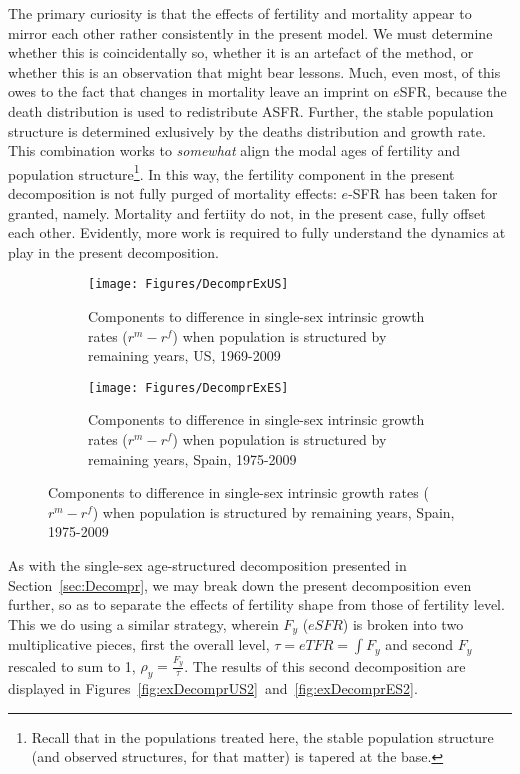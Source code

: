 The primary curiosity is that the effects of fertility and mortality appear to
mirror each other rather consistently in the present model. We must determine
whether this is coincidentally so, whether it is an artefact of the method, or
whether this is an observation that might bear lessons. Much, even most, of this
owes to the fact that changes in mortality leave an imprint on $e$SFR, because
the death distribution is used to redistribute ASFR. Further, the stable
population structure is determined exlusively by the deaths distribution and
growth rate. This combination works to \textit{somewhat} align the modal ages of
fertility and population structure\footnote{Recall that in the populations
treated here, the stable population structure (and observed structures, for
that matter) is tapered at the base.}. In this way, the fertility component in
the present decomposition is not fully purged of mortality effects: $e$-SFR has
been taken for granted, namely. Mortality and fertiity do not, in the present
case, fully offset each other. Evidently, more work is required to fully
understand the dynamics at play in the present decomposition.

\begin{figure}
        \centering
        \begin{subfigure}
                \centering
                \caption{Components to difference in single-sex intrinsic growth
                rates ($r^m - r^f$) when population is structured by remaining
                years, US, 1969-2009}
                \texttt{[image: Figures/DecomprExUS]}
                \label{fig:exDecomprUS}
        \end{subfigure}
        \begin{subfigure}
                \centering
                \caption{Components to difference in single-sex intrinsic growth
                rates ($r^m - r^f$) when population is structured by remaining
                years, Spain, 1975-2009}
                \texttt{[image: Figures/DecomprExES]}
                \label{fig:exDecomprES}
        \end{subfigure}
\end{figure}
 \FloatBarrier
As with the single-sex age-structured decomposition presented in
Section~\ref{sec:Decompr}, we may break down the present decomposition even
further, so as to separate the effects of fertility shape from those of
fertility level. This we do using a similar strategy, wherein $F_y$ ($eSFR$) is
broken into two multiplicative pieces, first the overall level, $\tau = eTFR =
\int F_y$ and second $F_y$ rescaled to sum to 1, $\rho_y = \frac{F_y}{\tau}$.
The results of this second decomposition are displayed in
Figures~\ref{fig:exDecomprUS2}~and~\ref{fig:exDecomprES2}.

